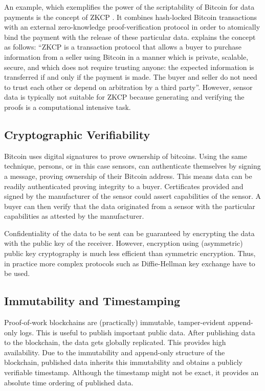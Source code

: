 An example, which exemplifies the power of the scriptability of Bitcoin for data payments is the concept of \ac{ZKCP} \parencite{maxwell2016zk,cryptoeprint:2016:451}. It combines hash-locked Bitcoin transactions with an external zero-knowledge proof-verification protocol in order to atomically bind the payment with the release of these particular data. \cite{maxwell2016zk} explains the concept as follows: ``\ac{ZKCP} is a transaction protocol that allows a buyer to purchase information from a seller using Bitcoin in a manner which is private, scalable, secure, and which does not require trusting anyone: the expected information is transferred if and only if the payment is made. The buyer and seller do not need to trust each other or depend on arbitration by a third party''. However, sensor data is typically not suitable for \ac{ZKCP} because generating and verifying the proofs is a computational intensive task.

\subsection{Cryptographic Verifiability}

Bitcoin uses digital signatures to prove ownership of bitcoins. Using the same technique, persons, or in this case sensors, can authenticate themselves by signing a message, proving ownership of their Bitcoin address. This means data can be readily authenticated proving integrity to a buyer. Certificates provided and signed by the manufacturer of the sensor could assert capabilities of the sensor. A buyer can then verify that the data originated from a sensor with the particular capabilities as attested by the manufacturer.

Confidentiality of the data to be sent can be guaranteed by encrypting the data with the public key of the receiver. However, encryption using (asymmetric) public key cryptography is much less efficient than symmetric encryption. Thus, in practice more complex protocols such as Diffie-Hellman key exchange \parencite{ISI:A1976CQ59200001} have to be used.

\subsection{Immutability and Timestamping}

Proof-of-work blockchains are (practically) immutable, tamper-evident append-only logs. This is useful to publish important public data. After publishing data to the blockchain, the data gets globally replicated. This provides high availability. Due to the immutability and append-only structure of the blockchain, published data inherits this immutability and obtains a publicly verifiable timestamp. Although the timestamp might not be exact, it provides an absolute time ordering of published data. 

